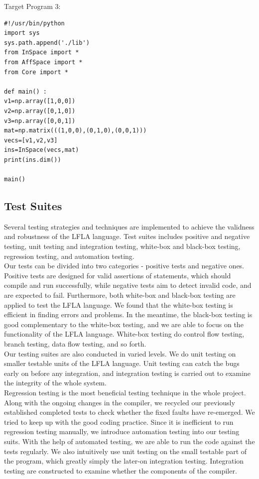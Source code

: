 \documentclass[12pt]{article} %
\begin{document}
\noindent Target Program 3: \\
\begin{lstlisting}
#!/usr/bin/python
import sys
sys.path.append('./lib')
from InSpace import *
from AffSpace import *
from Core import * 

def main() :
v1=np.array([1,0,0])
v2=np.array([0,1,0])
v3=np.array([0,0,1])
mat=np.matrix(((1,0,0),(0,1,0),(0,0,1)))
vecs=[v1,v2,v3]
ins=InSpace(vecs,mat)
print(ins.dim())

main()

\end{lstlisting}


\subsection{Test Suites}
\noindent Several testing strategies and techniques are implemented to achieve the validness and robustness of the LFLA language. Test suites includes positive and negative testing, unit testing and integration testing, white-box and black-box testing, regression testing, and automation testing.\\

\noindent Our tests can be divided into two categories - positive tests and negative ones. Positive tests are designed for valid assertions of statements, which should compile and run successfully, while negative tests aim to detect invalid code, and are expected to fail. Furthermore, both white-box and black-box testing are applied to test the LFLA language. We found that the white-box testing is efficient in finding errors and problems. In the meantime, the black-box testing is good complementary to the white-box testing, and we are able to focus on the functionality of the LFLA language. White-box testing do control flow testing, branch testing, data flow testing, and so forth. \\

\noindent Our testing suites are also conducted in varied levels. We do unit testing on smaller testable units of the LFLA language. Unit testing can catch the bugs early on before any integration, and integration testing is carried out to examine the integrity of the whole system. \\

\noindent Regression testing is the most beneficial testing technique in the whole project. Along with the ongoing changes in the compiler, we recycled our previously established completed tests to check whether the fixed faults have re-emerged. We tried to keep up with the good coding practice. Since it is inefficient to run regression testing manually, we introduce automation testing into our testing suits. With the help of automated testing, we are able to run the code against the tests regularly. We also intuitively use unit testing on the small testable part of the program, which greatly simply the later-on integration testing. Integration testing are constructed to examine whether the components of the compiler.
\end{document}
